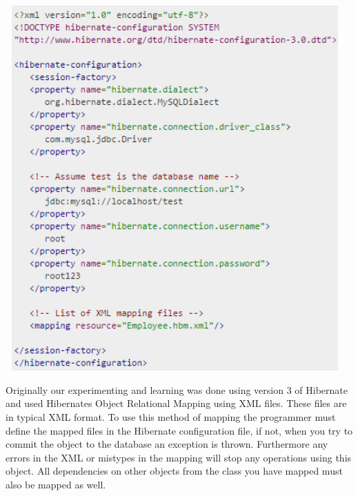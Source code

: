 \begin{center}    
	\includegraphics[height=14cm, width=13cm]{img/hibernatesettings.png}
\end{center}

Originally our experimenting and learning was done using version 3 of Hibernate and used Hibernates Object Relational Mapping using XML files. These files are in typical XML format. To use this method of mapping the programmer must define the mapped files in the Hibernate configuration file, if not, when you try to commit the object to the database an exception is thrown. Furthermore any errors in the XML or mistypes in the mapping will stop any operations using this object. All dependencies on other objects from the class you have mapped must also be mapped as well.

